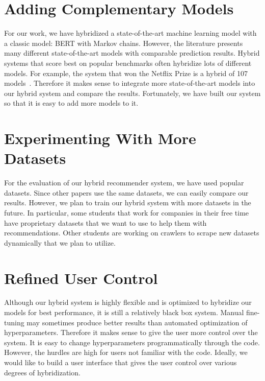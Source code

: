 



\section{Adding Complementary Models}
For our work, we have hybridized a state-of-the-art machine learning model with a classic model: BERT with Markov chains. However, the literature presents many different state-of-the-art models with comparable prediction results. Hybrid systems that score best on popular benchmarks often hybridize lots of different models. For example, the system that won the Netflix Prize is a hybrid of 107 models~\cite{Netflixprize}. Therefore it makes sense to integrate more state-of-the-art models into our hybrid system and compare the results. Fortunately, we have built our system so that it is easy to add more models to it.

\section{Experimenting With More Datasets}
For the evaluation of our hybrid recommender system, we have used popular datasets. Since other papers use the same datasets, we can easily compare our results. However, we plan to train our hybrid system with more datasets in the future. In particular, some students that work for companies in their free time have proprietary datasets that we want to use to help them with recommendations. Other students are working on crawlers to scrape new datasets dynamically that we plan to utilize.


\section{Refined User Control}
Although our hybrid system is highly flexible and is optimized to hybridize our models for best performance, it is still a relatively black box system. Manual fine-tuning may sometimes produce better results than automated optimization of hyperparameters. Therefore it makes sense to give the user more control over the system. It is easy to change hyperparameters programmatically through the code. However, the hurdles are high for users not familiar with the code. Ideally, we would like to build a user interface that gives the user control over various degrees of hybridization.


